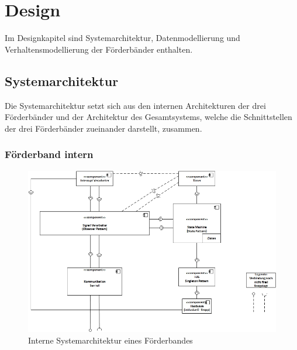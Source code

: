 \documentclass[a4paper, 11pt]{article}
\begin{document}
\newpage

\section{Design}
Im Designkapitel sind Systemarchitektur, Datenmodellierung und Verhaltensmodellierung der Förderbänder enthalten.

\subsection{Systemarchitektur}
Die Systemarchitektur setzt sich aus den internen Architekturen der drei Förderbänder und der Architektur des Gesamtsystems, welche die Schnittstellen der drei Förderbänder zueinander darstellt, zusammen.

\subsubsection{Förderband intern}

\begin{figure}[H]
\centering 
    \includegraphics[scale=0.7]{images/SW_Architektur/Foerderband.jpg}
    \caption{Interne Systemarchitektur eines Förderbandes}
    \label{archintern}
\end{figure}
\end{document}
